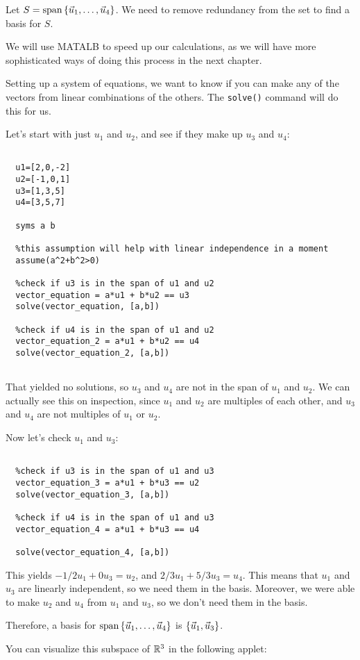 \documentclass{ximera}
\begin{document}
\begin{solution}
  Let $S=\text{span}\left\{\vec{u}_1,\ldots,\vec{u}_4\right\}$. We need to remove redundancy from the set to find a basis for $S$.

  We will use MATALB to speed up our calculations, as we will have more sophisticated ways of doing this process in the next chapter.

  Setting up a system of equations, we want to know if you can make any of the vectors from linear combinations of the others. The \texttt{solve()} command will do this for us.

  Let's start with just $u_1$ and $u_2$, and see if they make up $u_3$ and $u_4$:

  \begin{verbatim}
  
  u1=[2,0,-2]
  u2=[-1,0,1]
  u3=[1,3,5]
  u4=[3,5,7]

  syms a b

  %this assumption will help with linear independence in a moment
  assume(a^2+b^2>0)

  %check if u3 is in the span of u1 and u2
  vector_equation = a*u1 + b*u2 == u3
  solve(vector_equation, [a,b])

  %check if u4 is in the span of u1 and u2
  vector_equation_2 = a*u1 + b*u2 == u4
  solve(vector_equation_2, [a,b])
  

  \end{verbatim}

  That yielded no solutions, so $u_3$ and $u_4$ are not in the span of $u_1$ and $u_2$. We can actually see this on inspection, since $u_1$ and $u_2$ are multiples of each other, and $u_3$ and $u_4$ are not multiples of $u_1$ or $u_2$.

  Now let's check $u_1$ and $u_3$:

  \begin{verbatim}

  %check if u3 is in the span of u1 and u3
  vector_equation_3 = a*u1 + b*u3 == u2
  solve(vector_equation_3, [a,b])

  %check if u4 is in the span of u1 and u3
  vector_equation_4 = a*u1 + b*u3 == u4

  solve(vector_equation_4, [a,b])

  \end{verbatim}

  This yields $-1/2 u_1 + 0 u_3 = u_2$, and $2/3 u_1 + 5/3 u_3 = u_4$. This means that $u_1$ and $u_3$ are linearly independent, so we need them in the basis. Moreover, we were able to make $u_2$ and $u_4$ from $u_1$ and $u_3$, so we don't need them in the basis.

  Therefore, a basis for $\text{span}\left\{\vec{u}_1,\ldots,\vec{u}_4\right\}$ is $\left\{\vec{u}_1,\vec{u}_3\right\}$.

  You can visualize this subspace of $\mathbb{R}^3$ in the following applet:

  \begin{center}
  \end{center}

\end{solution}
\end{document}
